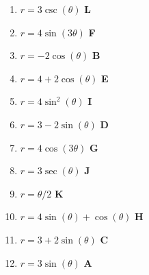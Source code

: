 \documentclass[11pt,answers]{exam}
\begin{document}
\newcommand\aline[1]{\textbf{ #1 } }

\vspace{2ex}
\begin{multicols}{3}
	\begin{enumerate}
		\item $r = 3\csc(\theta)$ \aline{L}
		\item $r=4\sin(3\theta)$ \aline{F}
		\item $r = -2 \cos(\theta)$ \aline{B}
		\item $r=4+2\cos(\theta)$ \aline{E}
		\item $r=4\sin^2(\theta)$ \aline{I}
		\item $r = 3-2\sin(\theta)$ \aline{D}
		\item $r=4\cos(3\theta)$ \aline{G}
		\item $r = 3\sec(\theta)$ \aline{J}
		\item $r = \theta/2$ \aline{K}
		\item $r=4\sin(\theta)+\cos(\theta)$ \aline{H}
		\item $r = 3+2\sin(\theta)$ \aline{C}
		\item $r = 3\sin(\theta)$ \aline{A}
	\end{enumerate}
	\end{multicols}
\clearpage
\end{document}
